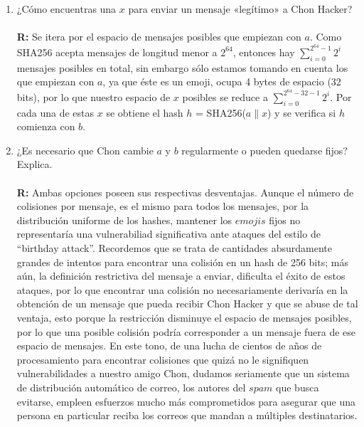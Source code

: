 \documentclass[14pt]{article}
\begin{document}
\begin{enumerate}[label=\alph*)]
\item ¿Cómo encuentras una $x$ para enviar un mensaje «legítimo» a Chon Hacker? \\ \\
\textbf{R:} Se itera por el espacio de mensajes posibles que empiezan con $a$. Como SHA256 acepta mensajes de longitud menor a $2^{64}$, entonces hay $\sum_{i = 0}^{2^{64} - 1} 2^i$ mensajes posibles en total, sin embargo sólo estamos tomando en cuenta los que empiezan con $a$, ya que éste es un emoji, ocupa 4 bytes de espacio (32 bits), por lo que nuestro espacio de $x$ posibles se reduce a $\sum_{i = 0}^{2^{64} - 32 - 1} 2^i$. Por cada una de estas $x$ se obtiene el hash $h$ = SHA256($a \parallel x$)  y se verifica si $h$ comienza con $b$.

\item ¿Es necesario que Chon cambie $a$ y $b$ regularmente o pueden quedarse fijos? Explica. \\ \\
  \textbf{R:} Ambas opciones poseen sus respectivas desventajas. Aunque el número de colisiones por mensaje, es el mismo para todos los mensajes, por la distribución uniforme de los hashes, mantener
  los $emojis$ fijos no representaría una vulnerabiliad significativa ante ataques del estilo de ``birthday attack''. Recordemos que se trata de cantidades absurdamente grandes de intentos para encontrar
  una colisión en un hash de 256 bits; más aún, la definición restrictiva del mensaje a enviar, dificulta el éxito de estos ataques, por lo que encontrar una colisión no necesariamente derivaría en la obtención de un mensaje que pueda recibir Chon Hacker y que se abuse de tal ventaja, esto porque la restricción disminuye el espacio de mensajes posibles, por lo que una posible colisión podría corresponder
  a un mensaje fuera de ese espacio de mensajes. En este tono, de una lucha  de cientos de años de procesamiento para encontrar colisiones que quizá no le signifiquen vulnerabilidades a nuestro amigo Chon, dudamos seriamente que un sistema de distribución automático de correo, los autores del $spam$ que busca evitarse,
  empleen esfuerzos mucho más comprometidos para asegurar que una persona en particular reciba los correos que mandan a múltiples destinatarios.\\


\end{enumerate}
\end{document}
